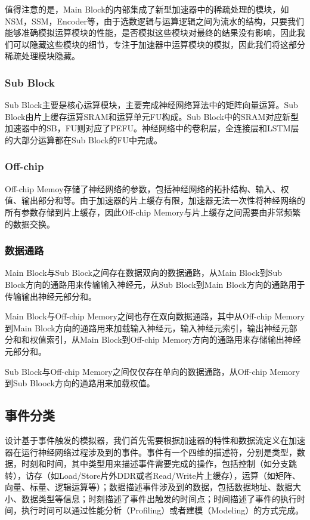 值得注意的是，Main Block的内部集成了新型加速器中的稀疏处理的模块，如NSM，SSM，Encoder等，由于选数逻辑与运算逻辑之间为流水的结构，只要我们能够准确模拟运算模块的性能，是否模拟这些模块对最终的结果没有影响，因此我们可以隐藏这些模块的细节，专注于加速器中运算模块的模拟，因此我们将这部分稀疏处理模块隐藏。

\subsubsection{Sub Block}
Sub Block主要是核心运算模块，主要完成神经网络算法中的矩阵向量运算。Sub Block由片上缓存运算SRAM和运算单元FU构成。Sub Block中的SRAM对应新型加速器中的SB，FU则对应了PEFU。神经网络中的卷积层，全连接层和LSTM层的大部分运算都在Sub Block的FU中完成。

\subsubsection{Off-chip}
Off-chip Memoy存储了神经网络的参数，包括神经网络的拓扑结构、输入、权值、输出部分和等。由于加速器的片上缓存有限，加速器无法一次性将神经网络的所有参数存储到片上缓存，因此Off-chip Memory与片上缓存之间需要由非常频繁的数据交换。

\subsubsection{数据通路}
Main Block与Sub Block之间存在数据双向的数据通路，从Main Block到Sub Block方向的通路用来传输输入神经元，从Sub Block到Main Block方向的通路用于传输输出神经元部分和。

Main Block与Off-chip Memory之间也存在双向数据通路，其中从Off-chip Memory到Main Block方向的通路用来加载输入神经元，输入神经元索引，输出神经元部分和和权值索引，从Main Block到Off-chip Memory方向的通路用来存储输出神经元部分和。

Sub Block与Off-chip Memory之间仅仅存在单向的数据通路，从Off-chip Memory到Sub Bloock方向的通路用来加载权值。


\subsection{事件分类}
设计基于事件触发的模拟器，我们首先需要根据加速器的特性和数据流定义在加速器在运行神经网络过程涉及到的事件。事件有一个四维的描述符，分别是类型，数据，时刻和时间，其中类型用来描述事件需要完成的操作，包括控制（如分支跳转），访存（如Load/Store片外DDR或者Read/Write片上缓存），运算（如矩阵、向量、标量、逻辑运算等）；数据描述事件涉及到的数据，包括数据地址、数据大小、数据类型等信息；时刻描述了事件出触发的时间点；时间描述了事件的执行时间，执行时间可以通过性能分析（Profiling）或者建模（Modeling）的方式完成。

